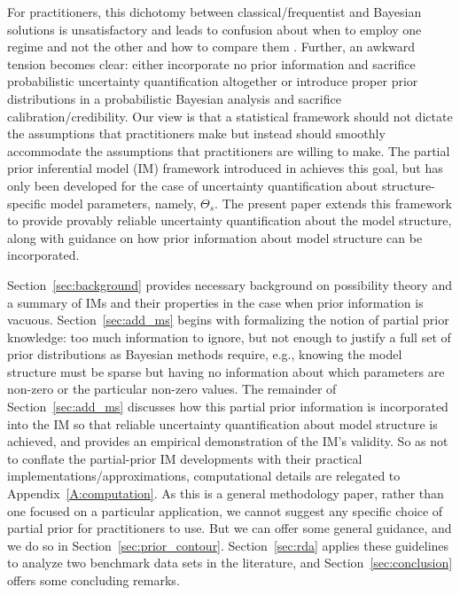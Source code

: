 \documentclass[12pt]{article}
\begin{document}
For practitioners, this dichotomy between classical/frequentist and Bayesian solutions is unsatisfactory and leads to confusion about when to employ one regime and not the other and how to compare them \citep[e.g.,][]{nelson2020quantifying}. Further, an awkward tension becomes clear: either incorporate no prior information and sacrifice probabilistic uncertainty quantification altogether or introduce proper prior distributions in a probabilistic Bayesian analysis and sacrifice calibration/credibility.
Our view is that a statistical framework should not dictate the assumptions that practitioners make but instead should smoothly accommodate the assumptions that practitioners are willing to make. The partial prior inferential model (IM) framework introduced in \citet{martin2022valid1, martin2022valid2, martin2023valid3} achieves this goal, but has only been developed for the case of uncertainty quantification about structure-specific model parameters, namely, $\Theta_s$. The present paper extends this framework to provide provably reliable uncertainty quantification about the model structure, along with guidance on how prior information about model structure can be incorporated.  

Section~\ref{sec:background} provides necessary background on possibility theory and a summary of IMs and their properties \citep[e.g.,][]{martin2022valid1, martin2022valid2, martin2023valid3} in the case when prior information is vacuous.  Section~\ref{sec:add_ms} begins with formalizing the notion of partial prior knowledge: too much information to ignore, but not enough to justify a full set of prior distributions as Bayesian methods require, e.g., knowing the model structure must be sparse but having no information about which parameters are non-zero or the particular non-zero values. The remainder of Section~\ref{sec:add_ms} discusses how this partial prior information is incorporated into the IM so that reliable uncertainty quantification about model structure is achieved, and provides an empirical demonstration of the IM's validity.  So as not to conflate the partial-prior IM developments with their practical implementations/approximations, computational details are relegated to Appendix~\ref{A:computation}.  As this is a general methodology paper, rather than one focused on a particular application, we cannot suggest any specific choice of partial prior for practitioners to use.  But we can offer some general guidance, and we do so in Section~\ref{sec:prior_contour}.  Section~\ref{sec:rda} applies these guidelines to analyze two benchmark data sets in the literature, and Section~\ref{sec:conclusion} offers some concluding remarks.
\end{document}
